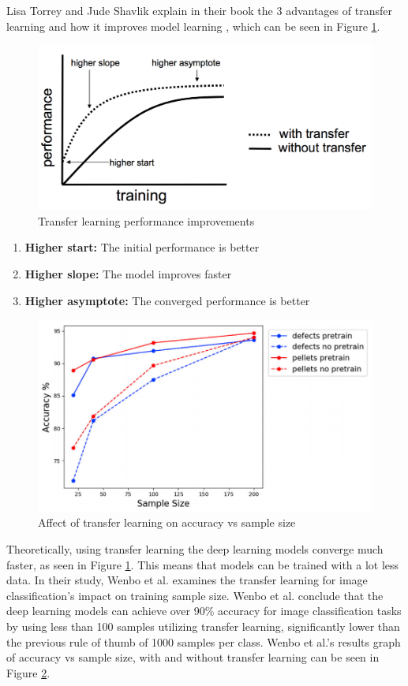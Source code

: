 Lisa Torrey and Jude Shavlik explain in their book the 3 advantages of transfer learning and how it improves model learning \cite{10.5555/1803899}, which can be seen in Figure \ref{fig:TL}.

\begin{figure}[h]
\centering
\includegraphics[width = 0.7\hsize]{figures/transfer-learning.png}
\caption{Transfer learning performance improvements \cite{10.5555/1803899}}
\label{fig:TL}
\end{figure}

\begin{enumerate}
  \item \textbf{Higher start:} The initial performance is better 
  \item \textbf{Higher slope:} The model improves faster 
  \item \textbf{Higher asymptote:} The converged performance is better 
\end{enumerate}

\begin{figure}[h]
\centering
\includegraphics[width = 0.7\hsize]{figures/transfer learning results.png}
\caption{Affect of transfer learning on accuracy vs sample size \cite{ZHU2021104269}}
\label{fig:TL-results}
\end{figure}

Theoretically, using transfer learning the deep learning models converge much faster, as seen in Figure \ref{fig:TL}. This means that models can be trained with a lot less data. In their study, Wenbo et al. examines the transfer learning for image classification's impact on training sample size. \cite{ZHU2021104269} Wenbo et al. conclude that the deep learning models can achieve over 90\% accuracy for image classification tasks by using less than 100 samples utilizing transfer learning, significantly lower than the previous rule of thumb of 1000 samples per class. Wenbo et al.'s results graph of accuracy vs sample size, with and without transfer learning can be seen in Figure \ref{fig:TL-results}.

